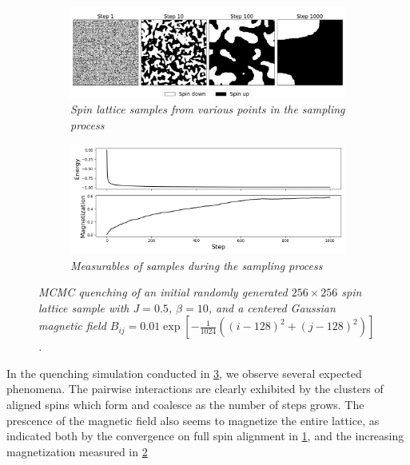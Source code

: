 \documentclass{article}
\begin{document}
\begin{figure}
    \begin{subfigure}{\textwidth}
        \includegraphics[width=\textwidth]{report_mcmc_gaussian}
        \centering
        \caption{\textit{Spin lattice samples from various points in the sampling process}}
        \label{fig:1a}
    \end{subfigure}
    \begin{subfigure}{\textwidth}
        \includegraphics[width=\textwidth]{report_mcmc_gaussian_measurables}
        \centering
        \caption{\textit{Measurables of samples during the sampling process}}
        \label{fig:1b}
    \end{subfigure}
    \centering
    \caption{\textit{
        MCMC quenching of an initial randomly generated $256 \times 256$ spin 
        lattice sample with $J = 0.5$, $\beta = 10$, and a centered Gaussian 
        magnetic field
        $B_{ij} = 0.01 \exp [-\frac{1}{1024}((i-128)^2 + (j-128)^2)]$. 
    }}
    \label{fig:mcmc_gaussian}
\end{figure}

In the quenching simulation conducted in \ref{fig:mcmc_gaussian}, we observe 
several expected phenomena. 
The pairwise interactions are clearly exhibited by the clusters of aligned spins 
which form and coalesce as the number of steps grows. 
The prescence of the magnetic field also seems to magnetize the entire lattice, 
as indicated both by the convergence on full spin alignment in \ref{fig:1a}, 
and the increasing magnetization measured in \ref{fig:1b}
\end{document}
